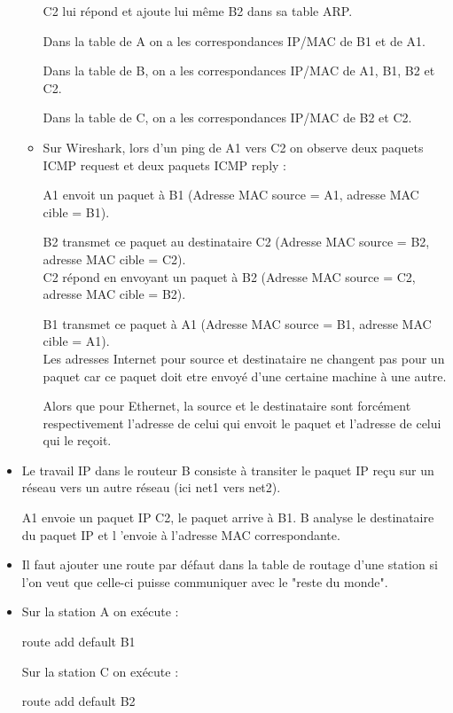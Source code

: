 \documentclass{article}
\begin{document}
\begin{itemize}
\begin{itemize}
C2 lui répond et ajoute lui même B2 dans sa table ARP.

Dans la table de A on a les correspondances IP/MAC de B1 et de A1.

Dans la table de B, on a les correspondances IP/MAC de A1, B1, B2 et C2.

Dans la table de C, on a les correspondances IP/MAC de B2 et C2.

	\item Sur Wireshark, lors d'un ping de A1 vers C2 on observe deux paquets ICMP request et deux paquets ICMP reply :

A1 envoit un paquet à B1 (Adresse MAC source = A1, adresse MAC cible = B1).

B2 transmet ce paquet au destinataire C2 (Adresse MAC source = B2, adresse MAC cible = C2).\\

C2 répond en envoyant un paquet à B2 (Adresse MAC source = C2, adresse MAC cible = B2). 

B1 transmet ce paquet à A1 (Adresse MAC source = B1, adresse MAC cible = A1).\\

Les adresses Internet pour source et destinataire ne changent pas pour un paquet car ce paquet doit etre envoyé d'une certaine machine à une autre.

Alors que pour Ethernet, la source et le destinataire sont forcément respectivement l'adresse de celui qui envoit le paquet et l'adresse de celui qui le reçoit.


	\end{itemize}

\item Le travail IP dans le routeur B consiste à transiter le paquet IP reçu sur un réseau vers un autre réseau (ici net1 vers net2).

A1 envoie un paquet IP C2, le paquet arrive à B1. B analyse le destinataire du paquet IP et l 'envoie à l'adresse MAC correspondante.

\item Il faut ajouter une route par défaut dans la table de routage d'une station si l'on veut que celle-ci puisse communiquer avec le "reste du monde".

\item Sur la station A on exécute :

route add default B1

Sur la station C on exécute :

route add default B2\\


\end{itemize}
\end{document}
